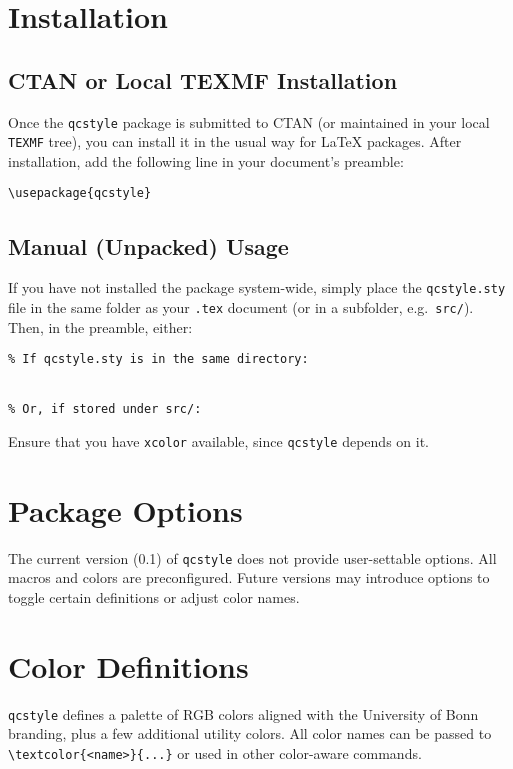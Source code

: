 \documentclass[a4paper,12pt]{article}
\begin{document}
\section{Installation}
\label{sec:installation}

\subsection{CTAN or Local TEXMF Installation}
Once the \texttt{qcstyle} package is submitted to CTAN (or maintained in your local \texttt{TEXMF} tree), you can install it in the usual way for LaTeX packages. After installation, add the following line in your document’s preamble:
\begin{verbatim}
\usepackage{qcstyle}
\end{verbatim}

\subsection{Manual (Unpacked) Usage}
If you have not installed the package system-wide, simply place the \texttt{qcstyle.sty} file in the same folder as your \texttt{.tex} document (or in a subfolder, e.g.\ \texttt{src/}). Then, in the preamble, either:
\begin{verbatim}
% If qcstyle.sty is in the same directory:


% Or, if stored under src/:

\end{verbatim}

Ensure that you have \texttt{xcolor} available, since \texttt{qcstyle} depends on it.

\section{Package Options}
\label{sec:options}
The current version (0.1) of \texttt{qcstyle} does not provide user-settable options. All macros and colors are preconfigured. Future versions may introduce options to toggle certain definitions or adjust color names.

\section{Color Definitions}
\label{sec:colors}
\texttt{qcstyle} defines a palette of RGB colors aligned with the University of Bonn branding, plus a few additional utility colors. All color names can be passed to \verb|\textcolor{<name>}{...}| or used in other color-aware commands.
\end{document}
